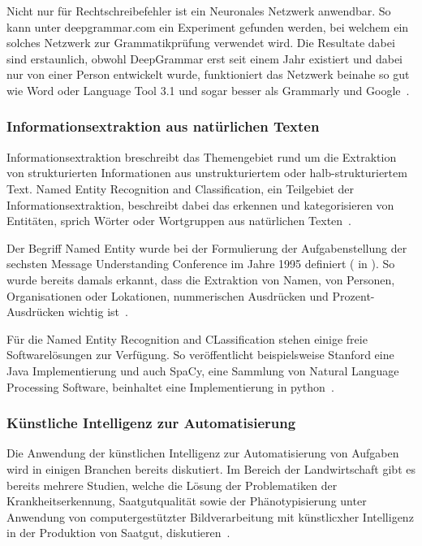 \documentclass{hwz}
\begin{document}
Nicht nur für Rechtschreibefehler ist ein Neuronales Netzwerk anwendbar. So kann unter deepgrammar.com ein Experiment gefunden werden, bei welchem ein solches Netzwerk zur Grammatikprüfung verwendet wird. Die Resultate dabei sind erstaunlich, obwohl DeepGrammar erst seit einem Jahr existiert und dabei nur von einer Person entwickelt wurde, funktioniert das Netzwerk beinahe so gut wie Word oder Language Tool 3.1 und sogar besser als Grammarly und Google~\autocite{MuganEvaluationComparison}.

\subsubsection{Informationsextraktion aus natürlichen Texten}


Informationsextraktion breschreibt das Themengebiet rund um die Extraktion von strukturierten Informationen aus unstrukturiertem oder halb-strukturiertem Text. Named Entity Recognition and Classification, ein Teilgebiet der Informationsextraktion, beschreibt dabei das erkennen und kategorisieren von Entitäten, sprich Wörter oder Wortgruppen aus natürlichen Texten~\autocite{Nadeau2007AClassification}.

Der Begriff Named Entity wurde bei der Formulierung der Aufgabenstellung der sechsten Message Understanding Conference im Jahre 1995 definiert (\cite{Borthwick1998NYU:MUC-7} in \cite{Nadeau2007AClassification}). So wurde bereits damals erkannt, dass die Extraktion von Namen, von Personen, Organisationen oder Lokationen,  nummerischen Ausdrücken und Prozent-Ausdrücken wichtig ist~\autocite{Nadeau2007AClassification}.

Für die Named Entity Recognition and CLassification stehen einige freie Softwarelösungen zur Verfügung. So veröffentlicht beispielsweise Stanford eine Java Implementierung und auch SpaCy, eine Sammlung von Natural Language Processing Software, beinhaltet eine Implementierung in python~\autocite{StanfordNLPGroupStanfordNER, ExplosionAIIndustrial-StrengthProcessing}.

\subsubsection{Künstliche Intelligenz zur Automatisierung}

Die Anwendung der künstlichen Intelligenz zur Automatisierung von Aufgaben wird in einigen Branchen bereits diskutiert. Im Bereich der Landwirtschaft gibt es bereits mehrere Studien, welche die Lösung der Problematiken der Krankheitserkennung, Saatgutqualität sowie der Phänotypisierung unter Anwendung von computergestützter Bildverarbeitung mit künstlicxher Intelligenz in der Produktion von Saatgut, diskutieren~\autocite{Patricio2018ComputerReview}. 
\end{document}
